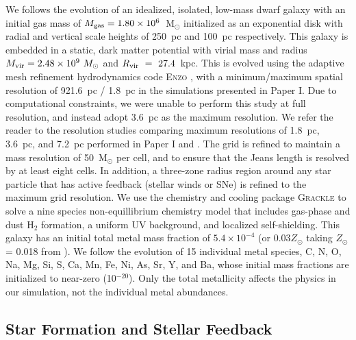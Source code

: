 \documentclass[twocolumn]{aastex62}
\begin{document}
We follows the evolution of an idealized, isolated, low-mass dwarf galaxy with an initial gas mass of $M_{\rm gas} = 1.80 \times 10^6$~M$_{\odot}$ initialized as an exponential disk with radial and vertical scale heights of 250~pc and 100~pc respectively. This galaxy is embedded in a static, \cite{Burkert1995} dark matter potential with virial mass and radius $M_{\rm vir} = 2.48\times 10^{9}~M_{\odot}$ and $R_{\rm vir}~=~27.4$~kpc. This is evolved using the adaptive mesh refinement hydrodynamics code \textsc{Enzo} \citep{Enzo2014}, with a minimum/maximum spatial resolution of 921.6~pc / 1.8~pc in the simulations presented in Paper I. Due to computational constraints, we were unable to perform this study at full resolution, and instead adopt 3.6~pc as the maximum resolution. We refer the reader to the resolution studies comparing maximum resolutions of 1.8~pc, 3.6~pc, and 7.2~pc performed in Paper I and \cite{Emerick2018b}. %
The grid is refined to maintain a mass resolution of 50~M$_{\odot}$ per cell, and to ensure that the Jeans length is resolved by at least eight cells. In addition, a three-zone radius region around any star particle that has active feedback (stellar winds or SNe) is refined to the maximum grid resolution. We use the chemistry and cooling package \textsc{Grackle} \citep{GrackleMethod} to solve a nine species non-equillibrium chemistry model that includes gas-phase and dust H$_2$ formation, a uniform UV background, and localized self-shielding. This galaxy has an initial total metal mass fraction of $5.4 \times 10^{-4}$ (or $0.03 Z_{\odot}$ taking $Z_{\odot}$ = 0.018 from \cite{Asplund2009}). We follow the evolution of 15 individual metal species, C, N, O, Na, Mg, Si, S, Ca, Mn, Fe, Ni, As, Sr, Y, and Ba, whose initial mass fractions are initialized to near-zero (10$^{-20}$). Only the total metallicity affects the physics in our simulation, not the individual metal abundances. 

\subsection{Star Formation and Stellar Feedback}
\label{sec:sf feedback}
\end{document}
